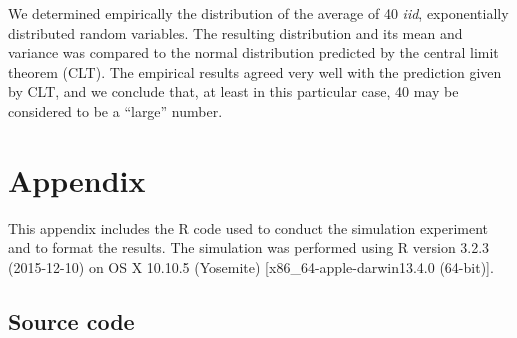 \documentclass[12pt,a4paper]{article}
\begin{document}
We determined empirically the distribution of the average of 40
\emph{iid}, exponentially distributed random variables. The resulting
distribution and its mean and variance was compared to the normal
distribution predicted by the central limit theorem (CLT). The empirical
results agreed very well with the prediction given by CLT, and we
conclude that, at least in this particular case, 40 may be considered to
be a ``large'' number.

\section{Appendix}\label{appendix}

This appendix includes the R code used to conduct the simulation
experiment and to format the results. The simulation was performed using
R version 3.2.3 (2015-12-10) on OS X 10.10.5 (Yosemite)
{[}x86\_64-apple-darwin13.4.0 (64-bit){]}.

\subsection{Source code}\label{source-code}
\end{document}
